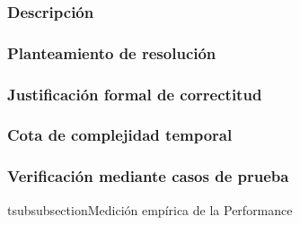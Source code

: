 \documentclass[11pt, a4paper, twoside]{article}
\begin{document}
{}

\subsubsection{Descripción}\label{subsubsec:ej2-descripcion}


\subsubsection{Planteamiento de resolución}\label{subsubsec:ej2-resolucion}


\subsubsection{Justificación formal de correctitud}\label{subsubsec:ej2-correctitud}


\subsubsection{Cota de complejidad temporal}\label{subsubsec:ej2-cotatemporal}


\subsubsection{Verificación mediante casos de prueba}\label{subsubsec:ej2-casosdeprueba}


tsubsubsection{Medición empírica de la Performance}\label{subsubsec:ej2-performance}

\end{document}
